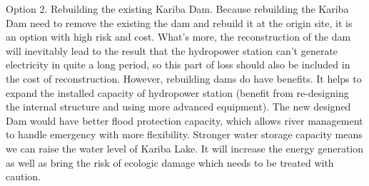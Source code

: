 \documentclass{mcmthesis}
\begin{document}
\indent Option 2. Rebuilding the existing Kariba Dam. Because rebuilding the Kariba Dam need to remove the existing the dam and rebuild it at the origin site, it is an option with high risk and cost. What's more, the reconstruction of the dam will inevitably lead to the result that the hydropower station can't generate electricity in quite a long period, so this part of loss should also be included in the cost of reconstruction. However, rebuilding dams do have benefits. It helps to expand the installed capacity of hydropower station (benefit from re-designing the internal structure and using more advanced equipment). The new designed Dam would have better flood protection capacity, which allows river management to handle emergency with more flexibility. Stronger water storage capacity means we can raise the water level of Kariba Lake. It will increase the energy generation as well as bring the risk of ecologic damage which needs to be treated with caution.\\
\end{document}
